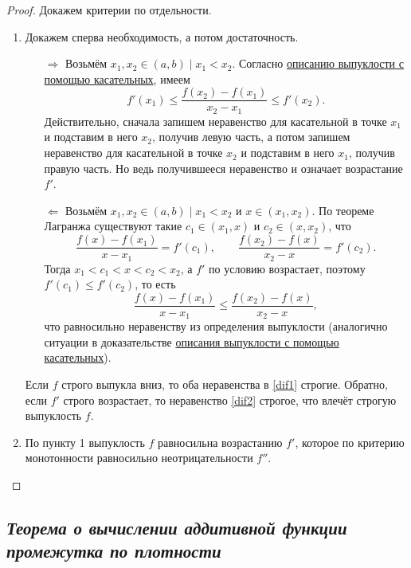 \begin{proof}
	Докажем критерии по отдельности.
	\begin{enumerate}
		\item Докажем сперва необходимость, а потом достаточность.
		\begin{enumerate}
			\item[\(\Rightarrow\)] \label{dif}Возьмём \(x_1, x_2 \in (a, b) \mid x_1 < x_2\). Согласно \hyperlink{vypkas}{описанию выпуклости с помощью касательных}, имеем
			\begin{equation}
				\label{dif1}
				f'(x_1) \leqslant \frac{f(x_2) - f(x_1)}{x_2 - x_1} \leqslant f'(x_2).
			\end{equation}
			Действительно, сначала запишем неравенство для касательной в точке \(x_1\) и подставим в него \(x_2\), получив левую часть, а потом запишем неравенство для касательной в точке \(x_2\) и подставим в него \(x_1\), получив правую часть. Но ведь получившееся неравенство и означает возрастание \(f'\).
			\item[\(\Leftarrow\)] Возьмём \(x_1, x_2 \in (a, b) \mid x_1 < x_2\) и \(x \in (x_1, x_2)\). По теореме Лагранжа существуют такие \(c_1 \in (x_1, x)\) и \(c_2 \in (x, x_2)\), что \[
				\frac{f(x) - f(x_1)}{x - x_1} = f'(c_1), \qquad \frac{f(x_2) - f(x)}{x_2 - x} = f'(c_2).
			\]
			Тогда \(x_1 < c_1 < x < c_2 < x_2\), а \(f'\) по условию возрастает, поэтому \(f'(c_1) \leqslant f'(c_2)\), то есть
			\begin{equation}
				\label{dif2}
				\frac{f(x) - f(x_1)}{x - x_1} \leqslant \frac{f(x_2) - f(x)}{x_2 - x},	
			\end{equation}
			что равносильно неравенству из определения выпуклости (аналогично ситуации в доказательстве \hyperlink{vypkas}{описания выпуклости с помощью касательных}).
		\end{enumerate}
		
		Если \(f\) строго выпукла вниз, то оба неравенства в \eqref{dif1} строгие. Обратно, если \(f'\) строго возрастает, то неравенство \eqref{dif2} строгое, что влечёт строгую выпуклость \(f\).
		
		\item По пункту 1 выпуклость \(f\) равносильна возрастанию \(f'\), которое по критерию монотонности равносильно неотрицательности \(f''\).
	\end{enumerate}
\end{proof}

\subsection{\itshape Теорема о вычислении аддитивной функции промежутка по плотности}

